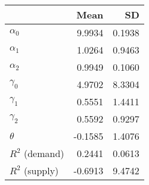 
\begin{tabular}[t]{lrr}
\toprule
  & Mean & SD\\
\midrule
$\alpha_{0}$ & 9.9934 & 0.1938\\
$\alpha_{1}$ & 1.0264 & 0.9463\\
$\alpha_{2}$ & 0.9949 & 0.1060\\
$\gamma_{0}$ & 4.9702 & 8.3304\\
$\gamma_{1}$ & 0.5551 & 1.4411\\
$\gamma_{2}$ & 0.5592 & 0.9297\\
$\theta$ & -0.1585 & 1.4076\\
$R^{2}$ (demand) & 0.2441 & 0.0613\\
$R^{2}$ (supply) & -0.6913 & 9.4742\\
\bottomrule
\end{tabular}
